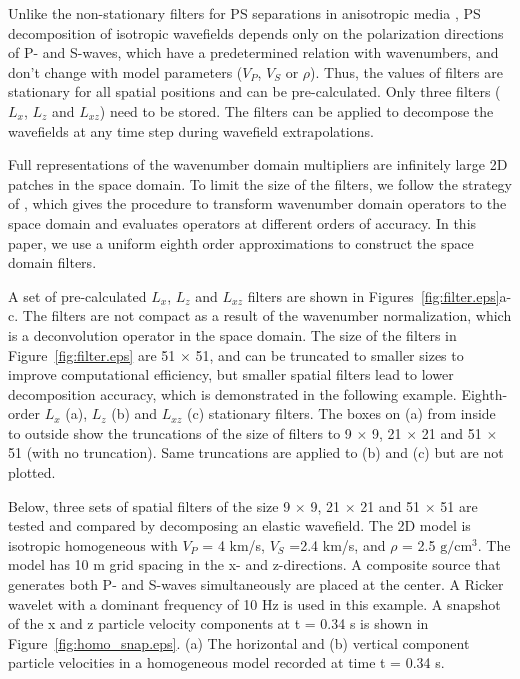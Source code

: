 \documentclass[manuscript,ulem,graphix,revised]{geophysics}
\begin{document}
Unlike the non-stationary filters for PS separations in anisotropic media \citep{yan09}, 
PS decomposition of isotropic wavefields depends only on the polarization directions of P- and S-waves, which have a predetermined relation with wavenumbers, and don't change with model parameters ($V_P$, $V_S$ or $\rho$). 
Thus, the values of filters are stationary for all spatial positions and can be pre-calculated. Only three filters ($L_x$, $L_z$ and $L_{xz}$) need to be stored. The filters can be applied to decompose the wavefields at any time step during wavefield extrapolations. 

Full representations of the wavenumber domain multipliers are infinitely large 2D patches in the space domain. To limit the size of the filters, we follow the strategy of \citet{yan09}, which gives the procedure to transform wavenumber domain operators to the space domain and evaluates operators at different orders of accuracy. 
In this paper, we use a uniform eighth order approximations to construct the space domain filters. 

A set of pre-calculated $L_x$, $L_z$ and $L_{xz}$ filters are shown in Figures~\ref{fig:filter.eps}a-c. The filters are not compact as a result of the wavenumber normalization, which is a deconvolution operator in the space domain. The size of the filters in Figure~\ref{fig:filter.eps} are 51 $\times$ 51, and can be truncated to smaller sizes to improve computational efficiency, but smaller spatial filters lead to lower decomposition accuracy, which is demonstrated in the following example. 
{
Eighth-order $L_x$ (a), $L_z$ (b) and $L_{xz}$ (c) stationary filters. The boxes on (a) from inside to outside show the truncations of the size of filters to 9 $\times$ 9, 21 $\times$ 21 and 51 $\times$ 51 (with no truncation). Same truncations are applied to (b) and (c) but are not plotted.
}

Below, three sets of spatial filters of the size 9 $\times$ 9, 21 $\times$ 21 and 51 $\times$ 51 are tested and compared by decomposing an elastic wavefield. The 2D model is isotropic homogeneous with $V_P$ = 4 km/s, $V_S$ =2.4 km/s, and $\rho$ = 2.5 $\mathrm{g/cm^3}$. The model has 10 m grid spacing in the x- and z-directions. A composite source that generates both P- and S-waves simultaneously are placed at the center. A Ricker wavelet with a dominant frequency of 10 Hz is used in this example. A snapshot of the x and z particle velocity components at t = 0.34 s is shown in Figure~\ref{fig:homo_snap.eps}.
{
(a) The horizontal and (b) vertical component particle velocities in a homogeneous model recorded at time t = 0.34 s.
}
\end{document}
